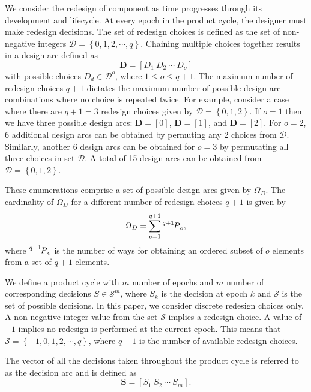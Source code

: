 We consider the redesign of component as time progresses through its development and lifecycle. At every epoch in the product cycle, the designer must make redesign decisions. The set of redesign choices is defined as the set of non-negative integers $\mathcal{D} = \left\{0,1,2,\cdots,q\right\}$. Chaining multiple choices together results in a design arc defined as
%
\begin{equation} \label{eq:designarc}
	\mathbf{D} = \left[D_1 ~ D_2 ~ \cdots ~ D_o\right]%
\end{equation}
%
with possible choices $D_d \in \mathcal{D}^o$, where $1 \leq o \leq q+1$. The maximum number of redesign choices $q + 1$ dictates the maximum number of possible design arc combinations where no choice is repeated twice. For example, consider a case where there are $q + 1 = 3$ redesign choices given by $\mathcal{D} = \left\{0,1,2\right\}$. If $o=1$ then we have three possible design arcs: $\mathbf{D} = \left[0\right]$, $\mathbf{D} = \left[1\right]$, and $\mathbf{D} = \left[2\right]$. For $o=2$, 6 additional design arcs can be obtained by permuting any 2 choices from $\mathcal{D}$. Similarly, another 6 design arcs can be obtained for $o=3$ by permutating all three choices in set $\mathcal{D}$. A total of 15 design arcs can be obtained from $\mathcal{D} = \left\{0,1,2\right\}$.

These enumerations comprise a set of possible design arcs given by $\Omega_D$. The cardinality of $\Omega_D$ for a different number of redesign choices $q+1$ is given by
%
\begin{equation} \label{eq:cardinality_eq}
	\Omega_D = \sum\limits_{o=1}^{q+1}\Myperm[q+1]{o},
\end{equation}
%
where $\Myperm[q+1]{o}$ is the number of ways for obtaining an ordered subset of $o$ elements from a set of $q+1$ elements.

We define a product cycle with $m$ number of epochs and $m$ number of corresponding decisions $S \in \mathcal{S}^m$, where $S_k$ is the decision at epoch $k$ and $\mathcal{S}$ is the set of possible decisions. In this paper, we consider discrete redesign choices only. A non-negative integer value from the set $\mathcal{S}$ implies a redesign choice. A value of $-1$ implies no redesign is performed at the current epoch. This means that $\mathcal{S} = \left\{-1,0,1,2,\cdots,q\right\}$, where $q + 1$ is the number of available redesign choices.

The vector of all the decisions taken throughout the product cycle is referred to as the decision arc and is defined as
%
\begin{equation} \label{eq:decisionarc}
	\mathbf{S} = \left[S_1 ~ S_2 ~ \cdots ~ S_m\right].
\end{equation}

